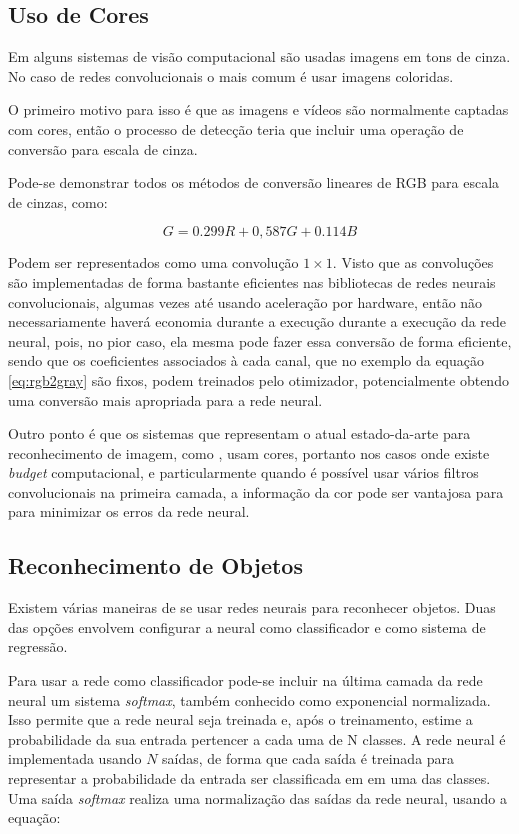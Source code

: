 \subsection{Uso de Cores}
Em alguns sistemas de visão computacional são usadas imagens em
tons de cinza. No caso de redes convolucionais o mais comum é usar
imagens coloridas.

O primeiro motivo para isso é que as imagens e vídeos são normalmente
captadas com cores, então o processo de detecção teria que incluir uma operação
de conversão para escala de cinza. 

Pode-se demonstrar todos os métodos de conversão lineares de RGB para escala de
cinzas, como:

\begin{equation} \label{eq:rgb2gray}
	G=0.299R + 0,587G + 0.114B
\end{equation}

Podem ser representados como uma convolução $1 \times 1$. Visto que as
convoluções são implementadas de forma bastante eficientes nas bibliotecas
de redes neurais convolucionais, algumas vezes até usando aceleração por
hardware, então não necessariamente haverá economia durante a execução
durante a execução da rede neural, pois, no pior caso, ela mesma pode fazer
essa conversão de forma eficiente, sendo que os coeficientes associados
à cada canal, que no exemplo da equação \ref{eq:rgb2gray} são fixos, podem
treinados pelo otimizador, potencialmente obtendo uma conversão mais apropriada
para a rede neural.

Outro ponto é que os sistemas que representam o atual
estado-da-arte para reconhecimento de imagem, como \cite{szegedy2015going}
\cite{hasanpour2016lets}, usam cores, portanto nos casos onde
existe \emph{budget} computacional, e particularmente quando é possível usar
vários filtros convolucionais na primeira camada, a informação da cor pode
ser vantajosa para para minimizar os erros da rede neural.

\subsection{Reconhecimento de Objetos}
Existem várias maneiras de se usar redes neurais para reconhecer objetos. Duas
das opções envolvem configurar a neural como classificador e como sistema de
regressão.

Para usar a rede como classificador pode-se incluir na última camada da rede
neural um sistema \emph{softmax}, também conhecido como exponencial
normalizada. Isso
permite que a rede neural seja treinada e, após o treinamento, estime a
probabilidade da sua entrada pertencer a cada uma de N classes. A rede neural é
implementada usando $N$ saídas, de forma que cada saída é treinada para
representar a probabilidade da entrada ser classificada em em uma das classes.
Uma saída \emph{softmax} realiza uma normalização das saídas da rede neural,
usando a equação:

